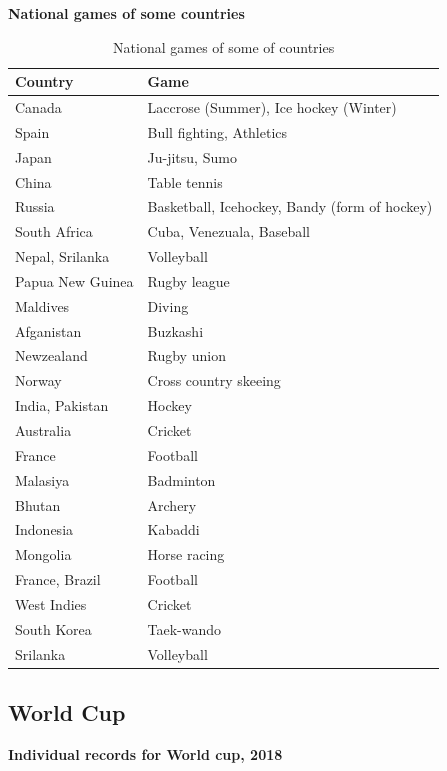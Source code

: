 \documentclass[
  openany]{book}
\begin{document}
\textbf{National games of some countries}

\begin{longtable}[t]{ll}
\caption{\label{tab:national-games}National games of some of countries}\\
\toprule
Country & Game\\
\midrule
\rowcolor{gray!6}  Canada & Laccrose (Summer), Ice hockey (Winter)\\
Spain & Bull fighting, Athletics\\
\rowcolor{gray!6}  Japan & Ju-jitsu, Sumo\\
China & Table tennis\\
\rowcolor{gray!6}  Russia & Basketball, Icehockey, Bandy (form of hockey)\\
\addlinespace
South Africa & Cuba, Venezuala, Baseball\\
\rowcolor{gray!6}  Nepal, \rowcolor{gray!6}  Srilanka & Volleyball\\
Papua New Guinea & Rugby league\\
\rowcolor{gray!6}  Maldives & Diving\\
Afganistan & Buzkashi\\
\addlinespace
\rowcolor{gray!6}  Newzealand & Rugby union\\
Norway & Cross country skeeing\\
\rowcolor{gray!6}  India, Pakistan & Hockey\\
Australia & Cricket\\
\rowcolor{gray!6}  France & Football\\
\addlinespace
Malasiya & Badminton\\
\rowcolor{gray!6}  Bhutan & Archery\\
Indonesia & Kabaddi\\
\rowcolor{gray!6}  Mongolia & Horse racing\\
France, Brazil & Football\\
\addlinespace
\rowcolor{gray!6}  West Indies & Cricket\\
South Korea & Taek-wando\\
Srilanka & Volleyball\\
\bottomrule
\end{longtable}

\hypertarget{world-cup}{%
\subsection{World Cup}\label{world-cup}}

\textbf{Individual records for World cup, 2018}
\end{document}
